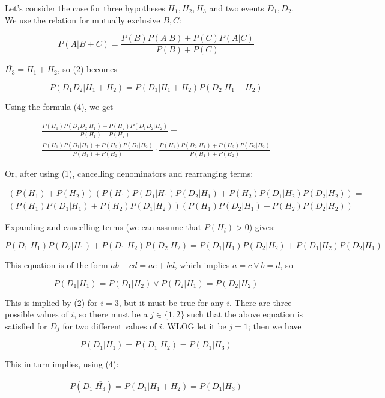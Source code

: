 \documentclass{note}
\begin{document}
\begin{solution}
Let's consider the case for three hypotheses $H_1, H_2, H_3$ and two events $D_1, D_2$. We use the relation for mutually exclusive $B, C$:

\begin{equation}
P(A | B + C) = \frac{P(B)P(A|B) + P(C)P(A|C)}{P(B) + P(C)}
\end{equation}

$\overline{H_3} = H_1 + H_2$, so (2) becomes

\begin{equation*}
P(D_1D_2|H_1 + H_2) = P(D_1|H_1 + H_2)P(D_2|H_1 + H_2)
\end{equation*}

Using the formula (4), we get

\begin{gather*}
\frac{P(H_1)P(D_1D_2|H_1) + P(H_2)P(D_1D_2|H_2)}{P(H_1) + P(H_2)} =\\
\frac{P(H_1)P(D_1|H_1) + P(H_2)P(D_1|H_2)}{P(H_1) + P(H_2)} \cdot 
\frac{P(H_1)P(D_2|H_1) + P(H_2)P(D_2|H_2)}{P(H_1) + P(H_2)}
\end{gather*}

Or, after using (1), cancelling denominators and rearranging terms:

\begin{gather*}
(P(H_1) + P(H_2))(P(H_1)P(D_1|H_1)P(D_2|H_1) + P(H_2)P(D_1|H_2)P(D_2|H_2)) =\\
(P(H_1)P(D_1|H_1) + P(H_2)P(D_1|H_2))(P(H_1)P(D_2|H_1) + P(H_2)P(D_2|H_2))
\end{gather*}

Expanding and cancelling terms (we can assume that $P(H_i)>0$) gives:

\begin{equation*}
P(D_1|H_1)P(D_2|H_1) + P(D_1|H_2)P(D_2|H_2) = P(D_1|H_1)P(D_2|H_2) + P(D_1|H_2)P(D_2|H_1)
\end{equation*}

This equation is of the form $ab + cd = ac + bd$, which implies $a = c \vee b = d$, so

\begin{equation*}
P(D_1|H_1) = P(D_1|H_2) \vee P(D_2|H_1) = P(D_2|H_2)
\end{equation*}

This is implied by (2) for $i=3$, but it must be true for any $i$. There are three possible values of $i$, so there must be a $j \in \{1, 2\}$ such that the above equation is satisfied for $D_j$ for two different values of $i$. WLOG let it be $j=1$; then we have

\begin{equation*}
P(D_1|H_1) = P(D_1|H_2) = P(D_1|H_3)
\end{equation*}

This in turn implies, using (4):

\begin{gather*}
P(D_1|\overline{H_3}) = P(D_1|H_1 + H_2) = P(D_1|H_3)
\end{gather*}
\end{solution}
\end{document}
